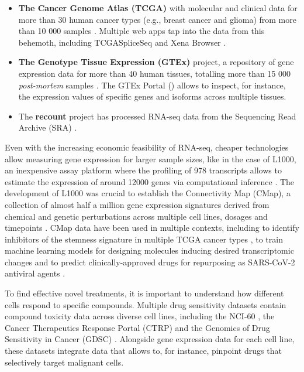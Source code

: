\begin{itemize}
	\item \textbf{The Cancer Genome Atlas (TCGA)} with molecular and clinical data for more than 30 human cancer types (e.g., breast cancer and glioma) from more than 10 000 samples \cite{chang:2013ww}. Multiple web apps tap into the data from this behemoth, including TCGASpliceSeq \cite{ryan:2016tm} and Xena Browser \cite{goldman:2020ub}.
	\item \textbf{The Genotype Tissue Expression (GTEx)} project, a repository of gene expression data for more than 40 human tissues, totalling more than 15 000 \emph{post-mortem} samples \cite{lonsdale:2013uo}. The GTEx Portal () allows to inspect, for instance, the expression values of specific genes and isoforms across multiple tissues.
	\item The \textbf{recount} project has processed RNA-seq data from the Sequencing Read Archive (SRA) \cite{collado-torres:2017uw,wilks:2021uc}.
\end{itemize}

Even with the increasing economic feasibility of RNA-seq, cheaper technologies allow measuring gene expression for larger sample sizes, like in the case of L1000, an inexpensive assay platform where the profiling of 978 transcripts allows to estimate the expression of around 12000 genes via computational inference \cite{subramanian:2017ul}. The development of L1000 was crucial to establish the Connectivity Map (CMap), a collection of almost half a million gene expression signatures derived from chemical and genetic perturbations across multiple cell lines, dosages and timepoints \cite{subramanian:2017ul}. CMap data have been used in multiple contexts, including to identify inhibitors of the stemness signature in multiple TCGA cancer types \cite{malta:2018uj}, to train machine learning models for designing molecules inducing desired transcriptomic changes \cite{mendez-lucio:2020th} and to predict clinically-approved drugs for repurposing as SARS-CoV-2 antiviral agents \cite{le:2021uq}.

To find effective novel treatments, it is important to understand how different cells respond to specific compounds. Multiple drug sensitivity datasets contain compound toxicity data across diverse cell lines, including the NCI-60 \cite{shoemaker:2006wi}, the Cancer Therapeutics Response Portal (CTRP) \cite{seashore-ludlow:2015ws} and the Genomics of Drug Sensitivity in Cancer (GDSC) \cite{yang:2012vk}. Alongside gene expression data for each cell line, these datasets integrate data that allows to, for instance, pinpoint drugs that selectively target malignant cells.

